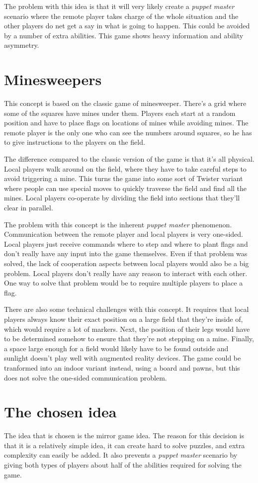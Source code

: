 	The problem with this idea is that it will very likely create a
	\emph{puppet master} scenario where the remote player takes charge
	of the whole situation and the other players do net get a
	say in what is going to happen. This could be avoided by a
	number of extra abilities. This game shows heavy
	information and ability asymmetry.

\section{Minesweepers}
	This concept is based on the classic game of minesweeper. There's a grid
	where some of the squares have mines under them. Players each start at a
	random position and have to place flags on locations of mines while avoiding
	mines. The remote player is the only one who can see the numbers around
	squares, so he has to give instructions to the players on the field.

	The difference compared to the classic version of the game is that it's all
	physical. Local players walk around on the field, where they have to take
	careful steps to avoid triggering a mine. This turns the game into some sort
	of Twister variant where people can use special moves to quickly traverse
	the field and find all the mines. Local players co-operate by dividing the
	field into sections that they'll clear in parallel.

	The problem with this concept is the inherent \emph{puppet master} phenomenon.
	Communication between the remote player and local players is very one-sided.
	Local players just receive commands where to step and where to plant flags
	and don't really have any input into the game themselves. Even if that
	problem was solved, the lack of cooperation aspects between local players
	would also be a big problem. Local players don't really have any reason to
	interact with each other. One way to solve that problem would be to require
	multiple players to place a flag.

	There are also some technical challenges with this concept. It requires that
	local players always know their exact position on a large field that they're
	inside of, which would require a lot of markers. Next, the position of their
	legs would have to be determined somehow to ensure that they're not stepping
	on a mine. Finally, a space large enough for a field would likely have to be
	found outside and sunlight doesn't play well with augmented reality devices.
	The game could be tranformed into an indoor variant instead, using a board
	and pawns, but this does not solve the one-sided communication problem.

\section{The chosen idea} \label{sec:chosenidea}
	The idea that is chosen is the mirror game idea. The reason for this
	decision is that it is a relatively simple idea, it can create hard
	to solve puzzles, and extra complexity can easily be added. It also
	prevents a \emph{puppet master} scenario by giving both types of players
	about half of the abilities required for solving the game.
